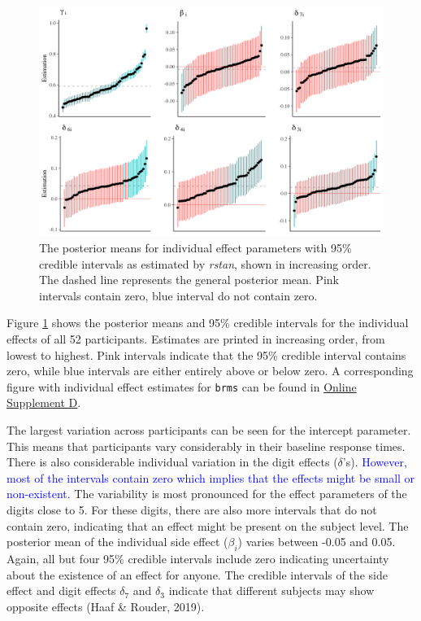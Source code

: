 \documentclass[
  english,
  doc,floatsintext]{apa6}
\begin{document}
\begin{figure}[H]

\includegraphics[width=1\linewidth]{I - Images/Fig10_randompar_v2} \hfill{}

\caption{The posterior means for individual effect parameters with 95\% credible intervals as estimated by \textit{rstan}, shown in increasing order. The dashed line represents the general posterior mean. Pink intervals contain zero, blue interval do not contain zero.}\label{fig:randomparfigure}
\end{figure}

Figure \ref{fig:randomparfigure} shows the posterior means and 95\% credible intervals for the individual effects of all 52 participants. Estimates are printed in increasing order, from lowest to highest. Pink intervals indicate that the 95\% credible interval contains zero, while blue intervals are either entirely above or below zero. A corresponding figure with individual effect estimates for \texttt{brms} can be found in \href{https://github.com/MyrtheV/Bayesian-Hierarchical-Modelling-An-Introduction-and-Reassessment/blob/main/D\%20-\%20Tutorial\%20Normal\%20Model\%20brms/Online-Supplement-D---Bayesian-Hierarchical-Modeling-in-brms.pdf}{Online Supplement D}.

The largest variation across participants can be seen for the intercept parameter. This means that participants vary considerably in their baseline response times. There is also considerable individual variation in the digit effects (\(\delta\)'s). \textcolor{blue}{However, most of the intervals contain zero which implies that the effects might be small or non-existent.} The variability is most pronounced for the effect parameters of the digits close to 5. For these digits, there are also more intervals that do not contain zero, indicating that an effect might be present on the subject level. The posterior mean of the individual side effect (\(\beta_{i}\)) varies between -0.05 and 0.05. Again, all but four 95\% credible intervals include zero indicating uncertainty about the existence of an effect for anyone. The credible intervals of the side effect and digit effects \(\delta_{7}\) and \(\delta_{3}\) indicate that different subjects may show opposite effects (Haaf \& Rouder, 2019).
\end{document}
